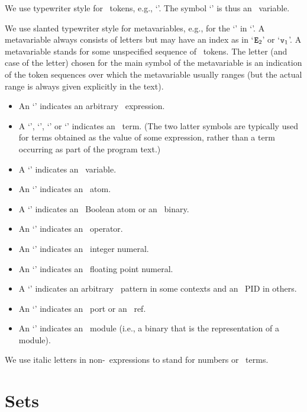 We use typewriter style for \Erlang\ tokens, e.g., `'.
The symbol `' is thus an \Erlang\ variable.

We use slanted typewriter style for metavariables, e.g.,
for the `' in `'.  A metavariable always consists of
letters but may have an index as
in `${\tt{\sl E}}_2$' or `${\tt{\sl v}}_1$'. A metavariable stands for some unspecified sequence
of \Erlang\ tokens.  The letter (and case of the letter) chosen for the main symbol of the
metavariable is an indication of the token sequences over which the metavariable usually ranges
(but the actual range is always given explicitly in the text).
\begin{itemize}
\item An `' indicates an arbitrary \Erlang\ expression.
\item A `', `', `' or `' indicates an \Erlang\ term.  (The two latter
symbols are typically used for terms obtained as the value of some expression, rather
than a term occurring as part of the program text.)
\item A `' indicates an \Erlang\ variable.
\item An `' indicates an \Erlang\ atom.
\item A `' indicates an \Erlang\ Boolean atom or an \Erlang\ binary.
\item An `' indicates an \Erlang\ operator.
\item An `' indicates an \Erlang\ integer numeral.
\item An `' indicates an \Erlang\ floating point numeral.
\item A `' indicates an arbitrary \Erlang\ pattern in some contexts
and an \Erlang\ PID in others.
\item An `' indicates an \Erlang\ port or an \Erlang\ ref.
\item An `' indicates an \Erlang\ module (i.e., a binary that is the representation
of a module).
\end{itemize}

We use italic letters in non-\Erlang\ expressions to stand for numbers or \Erlang\
terms.

\section{Sets}

